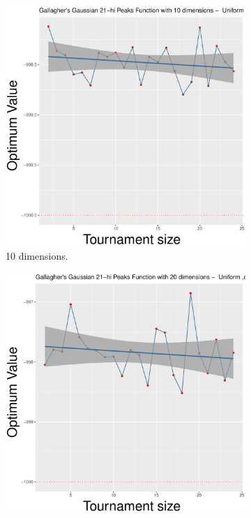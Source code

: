 \begin{figure}[t]
	\begin{subfigure}[b]{0.33\textwidth}
		\centering
		\includegraphics[width=\textwidth]{img/uniform-10D/multimodal_uniform_22_dim_10.pdf}
		\caption{10 dimensions.}
	\end{subfigure}
	\begin{subfigure}[b]{0.33\textwidth}
		\centering
		\includegraphics[width=\textwidth]{img/uniform-20D/multimodal_uniform_22_dim_20.pdf}

\end{subfigure}
\end{figure}
